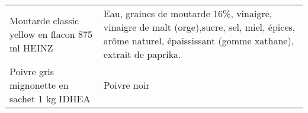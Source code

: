 \begin{longtable}{p{5cm}p{10cm}}
                                                           Moutarde classic yellow en flacon 875 ml HEINZ &                                                                                                                                                                                                                                                                                                                                                                                                                                                                                                                                                                                                                                                                                                                                                                                                                                                                               Eau, graines de moutarde 16\%, vinaigre, vinaigre de malt (orge),sucre, sel, miel, épices, arôme naturel, épaississant (gomme xathane), extrait de paprika. \\
                                                              Poivre gris mignonette en sachet 1 kg IDHEA &                                                                                                                                                                                                                                                                                                                                                                                                                                                                                                                                                                                                                                                                                                                                                                                                                                                                                                                                                                                                                              Poivre noir \\

\end{longtable}
